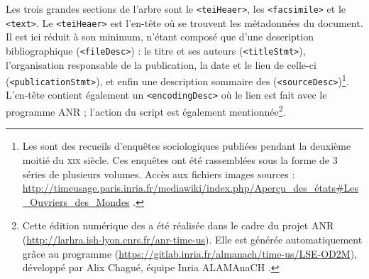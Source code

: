 Les trois grandes sections de l'arbre sont le \texttt{<teiHeaer>}, les \texttt{<facsimile>} et le \texttt{<text>}. Le \texttt{<teiHeaer>} est l'en-tête où se trouvent les métadonnées du document. Il est ici réduit à son minimum, n'étant composé que d'une description bibliographique (\texttt{<fileDesc>}) : le titre et ses auteurs (\texttt{<titleStmt>}), l'organisation responsable de la publication, la date et le lieu de celle-ci (\texttt{<publicationStmt>}), et enfin une description sommaire des \odm{} (\texttt{<sourceDesc>})\footnote{\og Les \odm{} sont des recueils d'enquêtes sociologiques publiées pendant la deuxième moitié du \textsc{xix}\ieme{} siècle. Ces enquêtes ont été rassemblées sous la forme de 3 séries de plusieurs volumes. Accès aux fichiers images sources : \url{http://timeusage.paris.inria.fr/mediawiki/index.php/Aperçu_des_états\#Les_Ouvriers_des_Mondes} \fg.}. L'en-tête contient également un \texttt{<encodingDesc>} où le lien est fait avec le programme ANR ; l'action du script \lse{} est également mentionnée\footnote{\og Cette édition numérique des \odm{} a été réalisée dans le cadre du projet ANR \timeus{} (\url{http://larhra.ish-lyon.cnrs.fr/anr-time-us}). Elle est générée automatiquement grâce au programme \lse{} (\url{https://gitlab.inria.fr/almanach/time-us/LSE-OD2M}), développé par Alix Chagué, équipe Inria ALAMAnaCH \fg.}.

